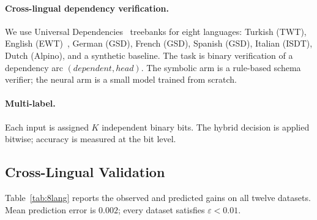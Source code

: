 \documentclass[11pt,a4paper]{article}
\begin{document}
\paragraph{Cross-lingual dependency verification.}
We use Universal Dependencies~\cite{nivre2020ud} treebanks for eight
languages:
Turkish (TWT), English (EWT)~\cite{silveira2014gold}, German (GSD), French (GSD),
Spanish (GSD), Italian (ISDT), Dutch (Alpino), and a synthetic
baseline. The task is binary verification of a dependency arc
$(dependent, head)$. The symbolic arm is a rule-based schema
verifier; the neural arm is a small model trained from scratch.

\paragraph{Multi-label.}
Each input is assigned $K$ independent binary bits. The hybrid
decision is applied bitwise; accuracy is measured at the bit level.

\subsection{Cross-Lingual Validation}
\label{sec:xling}

Table~\ref{tab:8lang} reports the observed and predicted gains on all
twelve datasets. Mean prediction error is $0.002$; every dataset
satisfies $\varepsilon < 0.01$.
\end{document}
